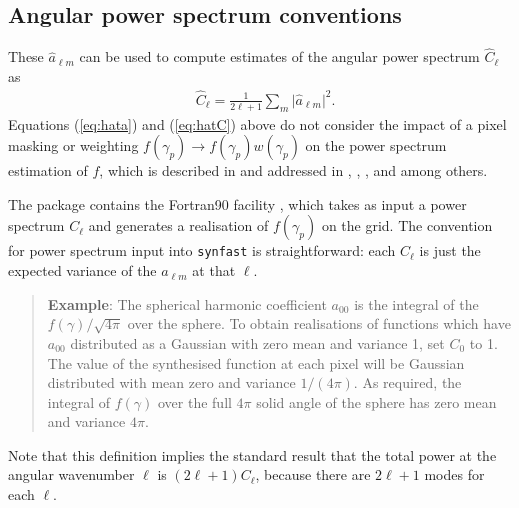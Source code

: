 \documentclass[12pt,twoside]{article}
\newcommand{\myhtmlimage}[1]{ }
\begin{document}

\subsection{Angular power spectrum conventions}
These $\hat{a}_{\ell m}$ can be used to compute estimates of the angular power spectrum
 $\hat{C}_\ell$ as 
\begin{align}
  & \hat{C}_\ell =\frac{1}{2\ell +1}\sum_{m} \vert\hat{a}_{\ell m}\vert^2.\myhtmlimage{}\label{eq:hatC}
\end{align}
Equations (\ref{eq:hata}) and (\ref{eq:hatC}) above do not consider the impact of a pixel masking or weighting 
$f(\gamma_p) \longrightarrow f(\gamma_p) w(\gamma_p)$ 
on the power spectrum estimation of $f$, which is described in 
\citet{whg2001}
and addressed in
\citet{master}, \citet{polspice}, \citet{xspect}, \citet{xfaster} and
\citet{planck2015-11}
among others.

The \healpix package contains the Fortran90 facility 
, 
which takes as input a power spectrum $C_\ell$ and generates a realisation of
$f(\gamma_p)$
on the \healpix grid.  The convention for power spectrum input into
\texttt{synfast} is straightforward: each $C_\ell$ is just the expected
variance of the $a_{\ell m}$ at that $\ell$. 

\begin{verse}
\textbf{Example}: The spherical harmonic coefficient $a_{00}$ is the
integral of the $f(\gamma)/\sqrt{4 \pi}$ over the sphere. To 
obtain realisations of functions which have $a_{00}$ distributed as a Gaussian
with zero mean and variance 1, set $C_0$ to 1.  The value of the
synthesised function at each pixel will
be Gaussian distributed with mean zero and variance $1/(4\pi)$. 
As required,  the integral of $f(\gamma)$ over the full $4\pi$
solid angle of the sphere has zero mean and variance $4\pi$. 
\end{verse}
Note that this definition implies the standard result that the total power
at the angular wavenumber $\ell$ is $(2\ell+1)C_\ell$, because there are
$2\ell+1$ modes for each  $\ell$. 
\end{document}
